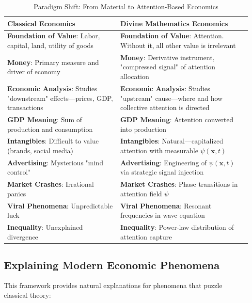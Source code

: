 \documentclass[11pt,a4paper]{article}
\theoremstyle{definition}
\theoremstyle{remark}
\begin{document}
\begin{table}[H]
\centering
\caption{Paradigm Shift: From Material to Attention-Based Economics}
\label{tab:material_vs_attention}
\begin{tabular}{|p{5.5cm}|p{5.5cm}|}
\hline
\textbf{Classical Economics} & \textbf{Divine Mathematics Economics} \\
\hline
\rowcolor{blue!10}
\textbf{Foundation of Value}: Labor, capital, land, utility of goods & \textbf{Foundation of Value}: Attention. Without it, all other value is irrelevant \\
\hline
\textbf{Money}: Primary measure and driver of economy & \textbf{Money}: Derivative instrument, "compressed signal" of attention allocation \\
\hline
\textbf{Economic Analysis}: Studies "downstream" effects—prices, GDP, transactions & \textbf{Economic Analysis}: Studies "upstream" cause—where and how collective attention is directed \\
\hline
\textbf{GDP Meaning}: Sum of production and consumption & \textbf{GDP Meaning}: Attention converted into production \\
\hline
\textbf{Intangibles}: Difficult to value (brands, social media) & \textbf{Intangibles}: Natural—capitalized attention with measurable \(\psi(\mathbf{x},t)\) \\
\hline
\rowcolor{green!10}
\textbf{Advertising}: Mysterious "mind control" & \textbf{Advertising}: Engineering of \(\psi(\mathbf{x},t)\) via strategic signal injection \\
\hline
\textbf{Market Crashes}: Irrational panics & \textbf{Market Crashes}: Phase transitions in attention field \(\psi\) \\
\hline
\textbf{Viral Phenomena}: Unpredictable luck & \textbf{Viral Phenomena}: Resonant frequencies in wave equation \\
\hline
\textbf{Inequality}: Unexplained divergence & \textbf{Inequality}: Power-law distribution of attention capture \\
\hline
\end{tabular}
\end{table}

\subsection{Explaining Modern Economic Phenomena}

This framework provides natural explanations for phenomena that puzzle classical theory:
\end{document}
